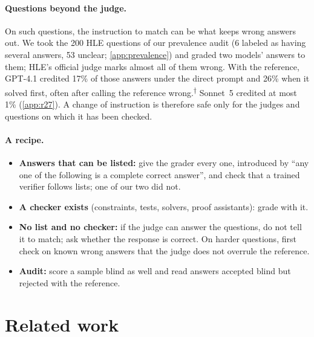 \documentclass{article}
\newcommand{\ph}{\textsuperscript{$\dagger$}}
\begin{document}
\paragraph{Questions beyond the judge.}
On such questions, the instruction to match can be what keeps wrong answers out.
We took the 200 HLE questions of our prevalence audit (6 labeled as having several answers, 53 unclear; \cref{app:prevalence}) and graded two models' answers to them; HLE's official judge marks almost all of them wrong.
With the reference, GPT-4.1 credited 17\% of those answers under the direct prompt and 26\% when it solved first, often after calling the reference wrong.\ph{}
Sonnet~5 credited at most 1\% (\cref{app:r27}).
A change of instruction is therefore safe only for the judges and questions on which it has been checked.

\paragraph{A recipe.}
\begin{itemize}[leftmargin=1.2em,itemsep=0pt,topsep=1pt,parsep=0pt]
\item \textbf{Answers that can be listed:} give the grader every one, introduced by ``any one of the following is a complete correct answer'', and check that a trained verifier follows lists; one of our two did not.
\item \textbf{A checker exists} (constraints, tests, solvers, proof assistants): grade with it.
\item \textbf{No list and no checker:} if the judge can answer the questions, do not tell it to match; ask whether the response is correct. On harder questions, first check on known wrong answers that the judge does not overrule the reference.
\item \textbf{Audit:} score a sample blind as well and read answers accepted blind but rejected with the reference.
\end{itemize}

\section{Related work}
\label{sec:related}
\end{document}
